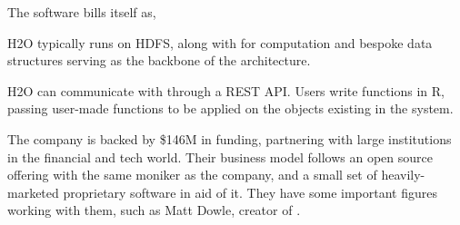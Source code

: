 The  software bills itself as,


H2O typically runs on HDFS, along with  for computation and bespoke
data structures serving as the backbone of the architecture.

H2O can communicate with \R{} through a REST API. Users write functions in
R, passing user-made functions to be applied on the objects existing in
the  system\cite{h2o.ai:_h2o}.

The company  is backed by \$146M in funding, partnering with large
institutions in the financial and tech world. Their business model
follows an open source offering with the same moniker as the company,
and a small set of heavily-marketed proprietary software in aid of it.
They have some important figures working with them, such as Matt Dowle,
creator of .
